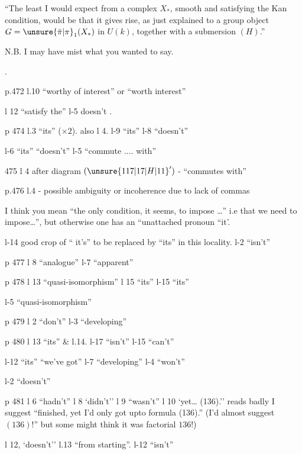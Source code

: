  \quad ``The least I would expect from a complex $X_{\ast}$, smooth and satisfying the Kan condition, would be that it gives rise, as just explained to a group object $G=\unsure{\bar{\pi}|\pi}_{1}(X_{\ast})$ in $U(k)$, together with a submersion $(H)$.''

N.B. I may have mist what you wanted to say.

.

p.472 l.10 ``worthy of interest'' or ``worth interest''

l 12 ``satisfy the'' \quad l-5 doesn't .

p 474 l.3 ``its'' ($\times 2$). also l 4. \quad l-9 ``its'' \quad l-8 ``doesn't''

l-6 ``its'' ``doesn't'' \quad l-5 ``commute .... with''

475 l 4 after diagram $(\unsure{117|17|H|11}')$ - ``commutes with''

p.476  l.4 -  possible ambiguity or incoherence due to lack of commas

I think you mean ``the only condition, it seems, to impose \ldots'' i.e that we need to impose\ldots'', but otherwise one has an ``unattached pronoun ``it'.

l-14 good crop of `` it's'' to be replaced by ``its'' in this locality. \quad l-2 ``isn't''

p 477 l 8 ``analogue'' \quad l-7 ``apparent''

p 478 l 13 ``quasi-isomorphism'' \quad l 15 ``its'' \quad l-15 ``its''

l-5 ``quasi-isomorphism''

p 479 l 2 ``don't'' \quad l-3 ``developing''

p 480 l 13 ``its'' \& l.14. \quad l-17 ``isn't'' \quad l-15 ``can't''

l-12 ``its'' ``we've got'' \quad l-7 ``developing'' \quad l-4 ``won't''

l-2 ``doesn't''

p 481 l 6 ``hadn't'' \quad l 8 `didn't'' \quad l 9 ``wasn't'' \quad l 10 `yet\ldots{} (136).'' reads badly I suggest ``finished, yet I'd only got upto formula (136).'' (I'd almost suggest $(136)!$'' but some might think it was factorial $136!$)

l 12, `doesn't'' \quad l.13 ``from starting''. \quad l-12 ``isn't''

